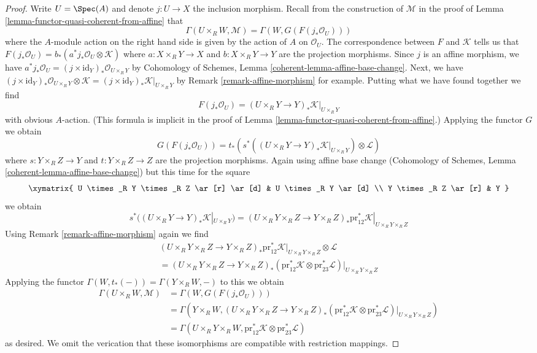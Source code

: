 \begin{proof}
\medskip\noindent
Write $U = \Spec(A)$ and denote $j : U \to X$ the inclusion morphism.
Recall from the construction of $\mathcal{M}$ in the proof of
Lemma \ref{lemma-functor-quasi-coherent-from-affine} that
$$
\Gamma(U \times_R W, \mathcal{M}) =
\Gamma(W, G(F(j_*\mathcal{O}_U)))
$$
where the $A$-module action on the right hand side is given by
the action of $A$ on $\mathcal{O}_U$. The correspondence between
$F$ and $\mathcal{K}$ tells us that
$F(j_*\mathcal{O}_U) = b_*(a^*j_*\mathcal{O}_U \otimes \mathcal{K})$
where $a : X \times_R Y \to X$ and $b : X \times_R Y \to Y$ are
the projection morphisms. Since $j$ is an affine morphism, we have
$a^*j_*\mathcal{O}_U = (j \times \text{id}_Y)_*\mathcal{O}_{U \times_R Y}$
by Cohomology of Schemes, Lemma
\ref{coherent-lemma-affine-base-change}.
Next, we have
$(j \times \text{id}_Y)_*\mathcal{O}_{U \times_R Y} \otimes \mathcal{K} =
(j \times \text{id}_Y)_*\mathcal{K}|_{U \times_R Y}$
by Remark \ref{remark-affine-morphism} for example.
Putting what we have found together we find
$$
F(j_*\mathcal{O}_U) =
(U \times_R Y \to Y)_*\mathcal{K}|_{U \times_R Y}
$$
with obvious $A$-action. (This formula is implicit in the proof
of Lemma \ref{lemma-functor-quasi-coherent-from-affine}.)
Applying the functor $G$ we obtain
$$
G(F(j_*\mathcal{O}_U)) =
t_*(s^*((U \times_R Y \to Y)_*\mathcal{K}|_{U \times_R Y})
\otimes \mathcal{L})
$$
where $s : Y \times_R Z \to Y$ and $t : Y \times_R Z \to Z$ are
the projection morphisms. Again using affine base change
(Cohomology of Schemes, Lemma \ref{coherent-lemma-affine-base-change})
but this time for the square
$$
\xymatrix{
U \times_R Y \times_R Z \ar[r] \ar[d] & U \times_R Y \ar[d] \\
Y \times_R Z \ar[r] & Y
}
$$
we obtain
$$
s^*((U \times_R Y \to Y)_*\mathcal{K}|_{U \times_R Y}) =
(U \times_R Y \times_R Z \to Y \times_R Z)_*
\text{pr}_{12}^*\mathcal{K}|_{U \times_R Y \times_R Z}
$$
Using Remark \ref{remark-affine-morphism} again we find
\begin{align*}
(U \times_R Y \times_R Z \to Y \times_R Z)_*
\text{pr}_{12}^*\mathcal{K}|_{U \times_R Y \times_R Z}
\otimes \mathcal{L} \\
=
(U \times_R Y \times_R Z \to Y \times_R Z)_*
\left(\text{pr}_{12}^*\mathcal{K} \otimes
\text{pr}_{23}^*\mathcal{L}\right)|_{U \times_R Y \times_R Z}
\end{align*}
Applying the functor $\Gamma(W, t_*(-)) = \Gamma(Y \times_R W, -)$
to this we obtain
\begin{align*}
\Gamma(U \times_R W, \mathcal{M})
& =
\Gamma(W, G(F(j_*\mathcal{O}_U))) \\
& =
\Gamma(Y \times_R W, (U \times_R Y \times_R Z \to Y \times_R Z)_*
(\text{pr}_{12}^*\mathcal{K} \otimes
\text{pr}_{23}^*\mathcal{L})|_{U \times_R Y \times_R Z}) \\
& =
\Gamma(U \times_R Y \times_R W,
\text{pr}_{12}^*\mathcal{K} \otimes \text{pr}_{23}^*\mathcal{L})
\end{align*}
as desired. We omit the verication that these isomorphisms are
compatible with restriction mappings.
\end{proof}


